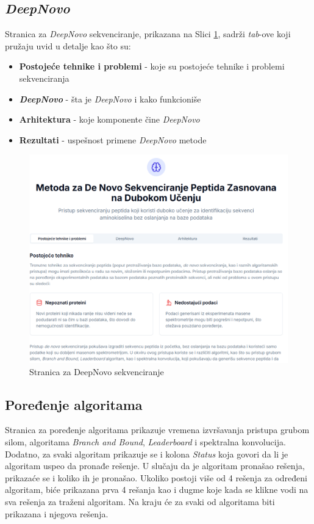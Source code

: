 \documentclass[12pt,oneside]{memoir}
\begin{document}
\subsection{\emph{DeepNovo}}
Stranica za \emph{DeepNovo} sekvenciranje, prikazana na Slici \ref{fig:deepnovo_1}, sadrži \emph{tab}-ove koji pružaju uvid u detalje kao što su:
\begin{itemize}
    \item \textbf{Postojeće tehnike i problemi} - koje su postojeće tehnike i problemi sekvenciranja
    \item \textbf{\emph{DeepNovo}} - šta je \emph{DeepNovo} i kako funkcioniše
    \item \textbf{Arhitektura} - koje komponente čine \emph{DeepNovo}
    \item \textbf{Rezultati} - uspešnost primene \emph{DeepNovo} metode
\end{itemize}

\begin{figure}[H]
\centering
\includegraphics[width=1\textwidth]{images/deepnovo_1.png}
\caption{Stranica za DeepNovo sekvenciranje}
\label{fig:deepnovo_1}
\end{figure}

\subsection{Poređenje algoritama}

Stranica za poređenje algoritama prikazuje vremena izvršavanja pristupa grubom silom, algoritama \emph{Branch and Bound}, \emph{Leaderboard} i spektralna konvolucija. Dodatno, za svaki algoritam prikazuje se i kolona \textit{Status} koja govori da li je algoritam uspeo da pronađe rešenje. U slučaju da je algoritam pronašao rešenja, prikazaće se i koliko ih je pronašao. Ukoliko postoji više od 4 rešenja za određeni algoritam, biće prikazana prva 4 rešanja kao i dugme koje kada se klikne vodi na sva rešenja za traženi algoritam. Na kraju će za svaki od algoritama biti prikazana i njegova rešenja. 
\end{document}
